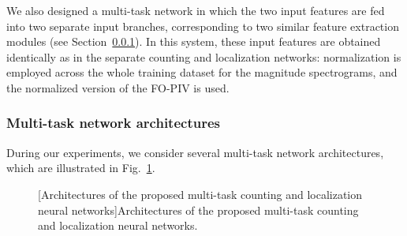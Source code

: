 We also designed a multi-task network in which the two input features are fed into two separate input branches, corresponding to two similar feature extraction modules (see Section~\ref{ss:multi-taskNetworkArchitectures}). In this system, these input features are obtained identically as in the separate counting and localization networks: normalization is employed across the whole training dataset for the magnitude spectrograms, and the normalized version of the FO-PIV is used.

\subsubsection{Multi-task network architectures}
\label{ss:multi-taskNetworkArchitectures}

During our experiments, we consider several multi-task network architectures, which are illustrated in Fig.~\ref{fig:hybrid_multi-taskNetworkArchitectures}.

\begin{figure}[t]
    \centering
    \begin{adjustbox}{width=1.3\textwidth,center}
    \end{adjustbox}
    [Architectures of the proposed multi-task counting and localization neural networks]{Architectures of the proposed multi-task counting and localization neural networks.}
    \label{fig:hybrid_multi-taskNetworkArchitectures}
\end{figure}

